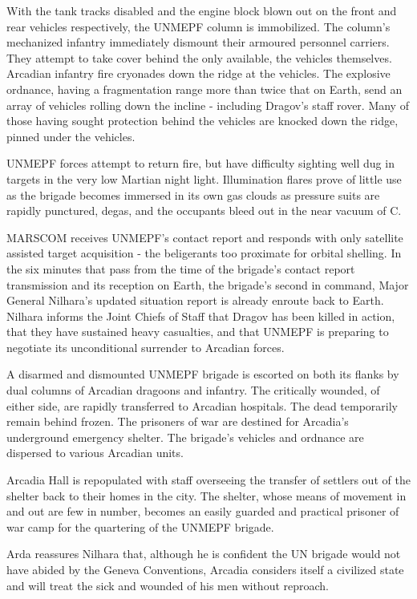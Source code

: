 With the tank tracks disabled and the engine block blown out on the front and rear vehicles respectively, the UNMEPF column is immobilized. The column's mechanized infantry immediately dismount their armoured personnel carriers. They attempt to take cover behind the only available, the vehicles themselves. Arcadian infantry fire cryonades down the ridge at the vehicles. The explosive ordnance, having a fragmentation range more than twice that on Earth, send an array of vehicles rolling down the incline - including Dragov's staff rover. Many of those having sought protection behind the vehicles are knocked down the ridge, pinned under the vehicles.

UNMEPF forces attempt to return fire, but have difficulty sighting well dug in targets in the very low Martian night light. Illumination flares prove of little use as the brigade becomes immersed in its own gas clouds as pressure suits are rapidly punctured, degas, and the occupants bleed out in the near vacuum of C.

MARSCOM receives UNMEPF's contact report and responds with only satellite assisted target acquisition - the beligerants too proximate for orbital shelling. In the six minutes that pass from the time of the brigade's contact report transmission and its reception on Earth, the brigade's second in command, Major General Nilhara's updated situation report is already enroute back to Earth. Nilhara informs the Joint Chiefs of Staff that Dragov has been killed in action, that they have sustained heavy casualties, and that UNMEPF is preparing to negotiate its unconditional surrender to Arcadian forces.
\StopTimelineDate

A disarmed and dismounted UNMEPF brigade is escorted on both its flanks by dual columns of Arcadian dragoons and infantry. The critically wounded, of either side, are rapidly transferred to Arcadian hospitals. The dead temporarily remain behind frozen. The prisoners of war are destined for Arcadia's underground emergency shelter. The brigade's vehicles and ordnance are dispersed to various Arcadian units.

Arcadia Hall is repopulated with staff overseeing the transfer of settlers out of the shelter back to their homes in the city. The shelter, whose means of movement in and out are few in number, becomes an easily guarded and practical prisoner of war camp for the quartering of the UNMEPF brigade.

Arda reassures Nilhara that, although he is confident the UN brigade would not have abided by the Geneva Conventions, Arcadia considers itself a civilized state and will treat the sick and wounded of his men without reproach.
\StopTimelineDate


